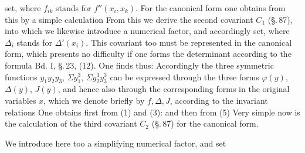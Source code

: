 set, where $f_{ik}$ stands for $f''(x_i,x_k)$. For the canonical form one obtains from this by a simple calculation
From this we derive the second covariant $C_1$ (\S.\,87), into which we likewise introduce a numerical factor, and accordingly
set, where $\Delta_i$ stands for $\Delta'(x_i)$. This covariant too must be represented in the canonical form, which presents no difficulty if one forms the determinant according to the formula Bd. I, \S.\,23, (12). One finds thus:
Accordingly the three symmetric functions $y_1y_2y_3$, $\Sigma y_1^3$, $\Sigma y_2^3y_3^3$ can be expressed through the three forms $\varphi(y)$, $\Delta(y)$, $J(y)$, and hence also through the corresponding forms in the original variables $x$, which we denote briefly by $f,\Delta,J$, according to the invariant relations
One obtains first from (1) and (3):
and then from (5)
Very simple now is the calculation of the third covariant $C_2$ (\S.\,87) for the canonical form.

We introduce here too a simplifying numerical factor, and set
